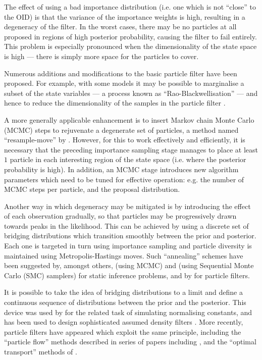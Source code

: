 \documentclass{article}
\begin{document}
The effect of using a bad importance distribution (i.e. one which is not ``close'' to the OID) is that the variance of the importance weights is high, resulting in a degeneracy of the filter. In the worst cases, there may be no particles at all proposed in regions of high posterior probability, causing the filter to fail entirely. This problem is especially pronounced when the dimensionality of the state space is high --- there is simply more space for the particles to cover.

Numerous additions and modifications to the basic particle filter have been proposed. For example, with some models it may be possible to marginalise a subset of the state variables --- a process known as ``Rao-Blackwellisation'' --- and hence to reduce the dimensionality of the samples in the particle filter \citep{Casella1996,Doucet2000}.

A more generally applicable enhancement is to insert Markov chain Monte Carlo (MCMC) steps to rejuvenate a degenerate set of particles, a method named ``resample-move'' by \citet{Gilks2001}. However, for this to work effectively and efficiently, it is necessary that the preceding importance sampling stage manages to place at least $1$ particle in each interesting region of the state space (i.e. where the posterior probability is high). In addition, an MCMC stage introduces new algorithm parameters which need to be tuned for effective operation: e.g. the number of MCMC steps per particle, and the proposal distribution.

Another way in which degeneracy may be mitigated is by introducing the effect of each observation gradually, so that particles may be progressively drawn towards peaks in the likelihood. This can be achieved by using a discrete set of bridging distributions which transition smoothly between the prior and posterior. Each one is targeted in turn using importance sampling and particle diversity is maintained using Metropolis-Hastings moves. Such ``annealing'' schemes have been suggested by, amongst others, \citet{Neal2001} (using MCMC) and \citet{DelMoral2006} (using Sequential Monte Carlo (SMC) samplers) for static inference problems, and by \citet{Godsill2001b,Gall2007,Deutscher2000} for particle filters.

It is possible to take the idea of bridging distributions to a limit and define a continuous sequence of distributions between the prior and the posterior. This device was used by \citet{Gelman1998} for the related task of simulating normalising constants, and has been used to design sophisticated assumed density filters \citep{Hanebeck2003a,Hanebeck2012,Hagmar2011}. More recently, particle filters have appeared which exploit the same principle, including the ``particle flow'' methods described in series of papers including \citep{Daum2008,Daum2011d}, and the ``optimal transport'' methods of \cite{Reich2011,Reich2012a}.
\end{document}
